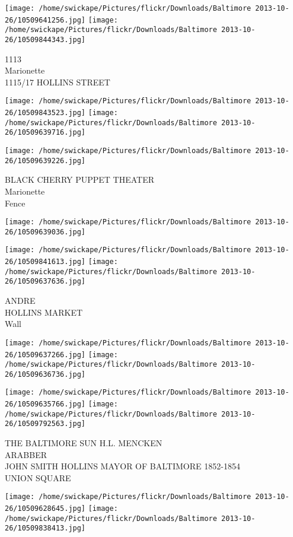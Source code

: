 \documentclass[10pt,letterpaper]{article}
\begin{document}
\vspace{0.25in}
\texttt{[image: /home/swickape/Pictures/flickr/Downloads/Baltimore 2013-10-26/10509641256.jpg]}
\texttt{[image: /home/swickape/Pictures/flickr/Downloads/Baltimore 2013-10-26/10509844343.jpg]}

1113\\
Marionette\\
1115/17 HOLLINS STREET
\pagebreak

\texttt{[image: /home/swickape/Pictures/flickr/Downloads/Baltimore 2013-10-26/10509843523.jpg]}
\texttt{[image: /home/swickape/Pictures/flickr/Downloads/Baltimore 2013-10-26/10509639716.jpg]}

\vspace{0.25in}
\texttt{[image: /home/swickape/Pictures/flickr/Downloads/Baltimore 2013-10-26/10509639226.jpg]}

BLACK CHERRY PUPPET THEATER\\
Marionette\\
Fence
\pagebreak

\texttt{[image: /home/swickape/Pictures/flickr/Downloads/Baltimore 2013-10-26/10509639036.jpg]}

\vspace{0.25in}
\texttt{[image: /home/swickape/Pictures/flickr/Downloads/Baltimore 2013-10-26/10509841613.jpg]}
\texttt{[image: /home/swickape/Pictures/flickr/Downloads/Baltimore 2013-10-26/10509637636.jpg]}

ANDRE\\
HOLLINS MARKET\\
Wall
\pagebreak

\texttt{[image: /home/swickape/Pictures/flickr/Downloads/Baltimore 2013-10-26/10509637266.jpg]}
\texttt{[image: /home/swickape/Pictures/flickr/Downloads/Baltimore 2013-10-26/10509636736.jpg]}

\texttt{[image: /home/swickape/Pictures/flickr/Downloads/Baltimore 2013-10-26/10509635766.jpg]}
\texttt{[image: /home/swickape/Pictures/flickr/Downloads/Baltimore 2013-10-26/10509792563.jpg]}

THE BALTIMORE SUN H.L. MENCKEN\\
ARABBER\\
JOHN SMITH HOLLINS MAYOR OF BALTIMORE 1852{-}1854\\
UNION SQUARE
\pagebreak

\texttt{[image: /home/swickape/Pictures/flickr/Downloads/Baltimore 2013-10-26/10509628645.jpg]}
\texttt{[image: /home/swickape/Pictures/flickr/Downloads/Baltimore 2013-10-26/10509838413.jpg]}
\end{document}
